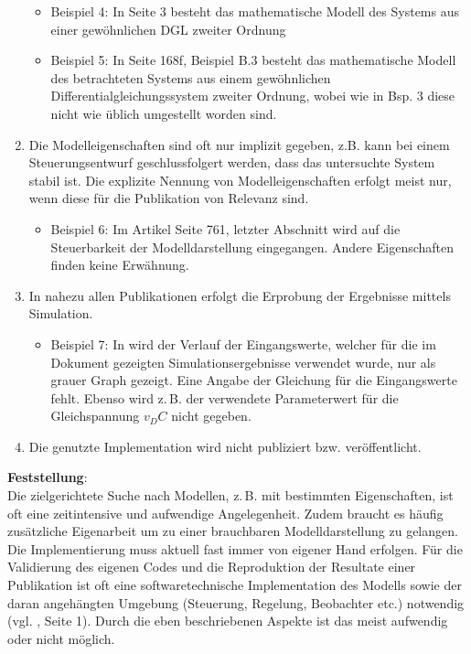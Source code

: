 \begin{enumerate}
\begin{itemize}[label=$\bullet$]
		\item Beispiel 4: In \cite{BUT21} Seite 3 besteht das mathematische Modell des Systems aus einer gewöhnlichen DGL zweiter Ordnung
		\item Beispiel 5: In \cite{KNO16} Seite 168f, Beispiel B.3 besteht das mathematische Modell des betrachteten Systems aus einem gewöhnlichen Differentialgleichungssystem zweiter Ordnung, wobei wie in Bsp. 3 diese nicht wie üblich umgestellt worden sind.
	\end{itemize}
	\item  Die Modelleigenschaften sind oft nur implizit gegeben, z.B. kann bei einem Steuerungsentwurf geschlussfolgert werden, dass das untersuchte System stabil ist. Die explizite Nennung von Modelleigenschaften erfolgt meist nur, wenn diese für die Publikation von Relevanz sind. 
	\begin{itemize}[label=$\bullet$]
		\item Beispiel 6: Im Artikel \cite{PEGUEA16} Seite 761, letzter Abschnitt wird auf die Steuerbarkeit der Modelldarstellung eingegangen. Andere Eigenschaften finden keine Erwähnung.
	\end{itemize}
	\item In nahezu allen Publikationen erfolgt die Erprobung der Ergebnisse mittels Simulation. 
	\begin{itemize}[label=$\bullet$]
		\item Beispiel 7: In \cite{BUT21} wird der Verlauf der Eingangswerte, welcher für die im Dokument gezeigten Simulationsergebnisse verwendet wurde, nur als grauer Graph gezeigt. Eine Angabe der Gleichung für die Eingangswerte fehlt. Ebenso wird z.\,B. der verwendete Parameterwert für die Gleichspannung $v_DC$ nicht gegeben.
	\end{itemize}
	\item Die genutzte Implementation wird nicht publiziert bzw. veröffentlicht.
\end{enumerate}

\textbf{Feststellung}:\\
Die zielgerichtete Suche nach Modellen, z.\,B. mit bestimmten Eigenschaften, ist oft eine zeitintensive und aufwendige Angelegenheit. Zudem braucht es häufig zusätzliche Eigenarbeit um zu einer brauchbaren Modelldarstellung zu gelangen. Die Implementierung muss aktuell fast immer von eigener Hand erfolgen. Für die Validierung des eigenen Codes und die Reproduktion der Resultate einer Publikation ist oft eine softwaretechnische Implementation des Modells sowie der daran angehängten Umgebung (Steuerung, Regelung, Beobachter etc.) notwendig (vgl. \cite{KNHE20b}, Seite 1). Durch die eben beschriebenen Aspekte ist das meist aufwendig oder nicht möglich.

